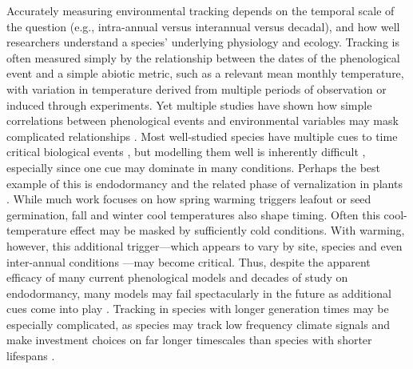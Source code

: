 \documentclass[11pt,letterpaper]{article}
\begin{document}
Accurately measuring environmental tracking depends on the temporal scale of the question (e.g., intra-annual versus interannual versus decadal), and how well researchers understand a species' underlying physiology and ecology. Tracking is often measured simply by the relationship between the dates of the phenological event and a simple abiotic metric, such as a relevant mean monthly temperature, with variation in temperature derived from multiple periods of observation or induced through experiments.  Yet multiple studies have shown how simple correlations between phenological events and environmental variables may mask complicated relationships \citep{Cook:2012pnas,thackeray2016,tansey2017}. Most well-studied species have multiple cues to time critical biological events \citep{chuinearees}, but modelling them well is inherently difficult \citep{chuine2016}, especially since one cue may dominate in many conditions. Perhaps the best example of this is endodormancy and the related phase of vernalization in plants \citep{chuine2016,Burghardt2015}. While much work focuses on how spring warming triggers leafout or seed germination, fall and winter cool temperatures also shape timing. Often this cool-temperature effect may be masked by sufficiently cold conditions. With warming, however, this additional trigger---which appears to vary by site, species and even inter-annual conditions \citep{Burghardt2015}---may become critical. Thus, despite the apparent efficacy of many current phenological models and decades of study on endodormancy, many models may fail spectacularly in the future as additional cues come into play \citep{dennis2003,chuine2016}. Tracking in species with longer generation times may be especially complicated, as species may track low frequency climate signals and make investment choices on far longer timescales than species with shorter lifespans \citep{morris2008}. 
\end{document}
